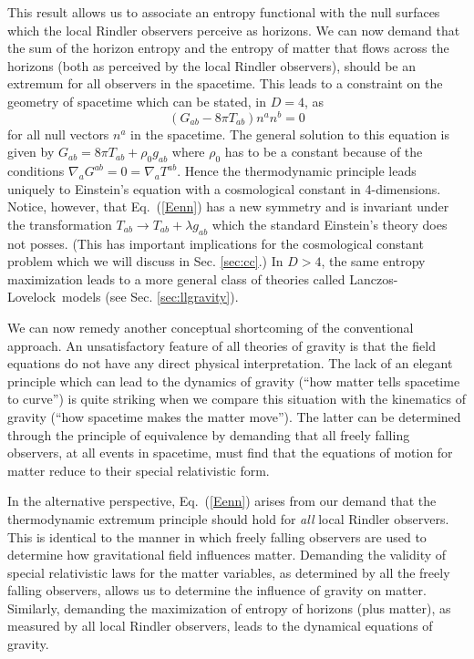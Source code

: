 \documentclass[12pt]{iopart}
\def\eq#1{{Eq.~(\ref{#1})}}
\newcommand{\LL}{Lanczos-Lovelock}
\begin{document}
This result allows us to associate an entropy functional with the null surfaces which the local Rindler observers perceive as  horizons. 
We can now demand that the sum of the horizon entropy and the entropy of matter that flows across the horizons (both as perceived by the local Rindler observers), should be an extremum for all observers in the spacetime.
This leads \cite{TPgravitystory} to a constraint on the geometry of spacetime which can be stated, in $D=4$, as 
\begin{equation}
 (G_{ab} - 8\pi T_{ab}) n^a n^b =0
 \label{Eenn}
\end{equation} 
for all null vectors $n^a$ in the spacetime.
The general solution to this equation is given by $G_{ab} = 8\pi T_{ab} + \rho_0 g_{ab}$
where $\rho_0$ has to be a constant because of the conditions $\nabla_a G^{ab} =0 = \nabla_aT^{ab}$.
Hence the thermodynamic principle leads uniquely to Einstein's equation with a cosmological constant in 4-dimensions. Notice, however, that \eq{Eenn} has a new symmetry and is invariant \cite{TPgravimmune,TPgravijtmp} under the transformation $T_{ab} \to T_{ab} + \lambda g_{ab}$ which 
the standard Einstein's theory does not posses. (This has important implications for the cosmological constant problem  \cite{TPadvscilett} which we will discuss in Sec. \ref{sec:cc}.)
In $D>4$, the same entropy maximization 
 leads to a more general class of theories called \LL\ models (see Sec. \ref{sec:llgravity}).

We can now remedy another conceptual shortcoming of the conventional approach.
An unsatisfactory feature of all theories of gravity is that the field
equations do not have any direct physical interpretation. 
The lack of an elegant principle which can lead to the dynamics of gravity
(``how matter tells spacetime to curve'')
is quite striking when we compare this situation with the kinematics of gravity (``how spacetime makes the matter move''). The latter can be determined through the principle of equivalence by demanding that all freely falling observers, at all events in spacetime, must find that the equations of motion for matter  reduce to their special relativistic form.
 
In the alternative perspective, \eq{Eenn} arises from our demand that the thermodynamic extremum principle should hold for \textit{all} local Rindler observers.   
This is identical  to the manner in which  freely falling observers are used to determine how gravitational field influences matter. Demanding the validity of special relativistic laws for the 
 matter variables, as determined by all the freely falling observers, allows us to 
determine the influence of gravity on matter. Similarly, demanding the maximization of entropy of horizons (plus matter), as measured by all local Rindler observers, leads to the dynamical equations of gravity.
\end{document}
